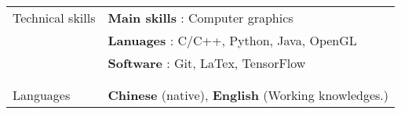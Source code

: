 \documentclass[letterpaper,11pt,oneside]{article}
\begin{document}
\begin{tabular}{@{} l l}
\Large{Technical skills} & \textbf{Main skills \hspace{0.2em}}:  Computer graphics  \\
                         & \textbf{Lanuages   \hspace{0.7em} }:  C/C++, Python, Java, OpenGL \\
                         & \textbf{Software  \hspace{1em} }:  Git, LaTex, TensorFlow \\
 & \\  
  & \\  
\Large{Languages}   & \textbf{Chinese} (native), \textbf{English} (Working knowledges.) \\
    
          
\end{tabular}
\end{document}
